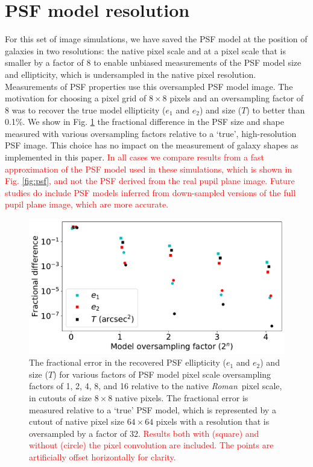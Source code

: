 \documentclass[usenatbib]{mnras}
\newcommand{\wfirst}{{\slshape Roman}}
\newcommand{\changetext}[1]{\textcolor{red}{#1}}
\begin{document}
\section{PSF model resolution}
\label{app:psf_resol}

For this set of image simulations, we have saved the PSF model at the position of galaxies in two resolutions: the native pixel scale and at a pixel scale that is smaller by a factor of 8 to enable unbiased measurements of the PSF model size and ellipticity, which is undersampled in the native pixel resolution. Measurements of PSF properties use this oversampled PSF model image. The motivation for choosing a pixel grid of $8\times8$ pixels and an oversampling factor of 8 was to recover the true model ellipticity ($e_1$ and $e_2$) and size ($T$) to better than 0.1\%. We show in Fig. \ref{fig:psf_oversampling} the fractional difference in the PSF size and shape measured with various oversampling factors relative to a `true', high-resolution PSF image. This choice has no impact on the measurement of galaxy shapes as implemented in this paper. \changetext{In all cases we compare results from a fast approximation of the PSF model used in these simulations, which is shown in Fig. \ref{fig:psf}, and not the PSF derived from the real pupil plane image. Future studies do include PSF models inferred from down-sampled versions of the full pupil plane image, which are more accurate.}
 
\begin{figure}
\begin{center}
\includegraphics[width=\columnwidth]{figures/psf_oversampling.pdf}
\end{center}
\caption[]{
The fractional error in the recovered PSF ellipticity ($e_1$ and $e_2$) and size ($T$) for various factors of PSF model pixel scale oversampling factors of 1, 2, 4, 8, and 16 relative to the native \wfirst\ pixel scale, in cutouts of size $8\times 8$ native pixels. The fractional error is measured relative to a `true' PSF model, which is represented by a cutout of native pixel size $64\times64$ pixels with a resolution that is oversampled by a factor of 32. \changetext{Results both with (square) and without (circle) the pixel convolution are included. The points are artificially offset horizontally for clarity.}
\label{fig:psf_oversampling}}
\end{figure}
\end{document}
